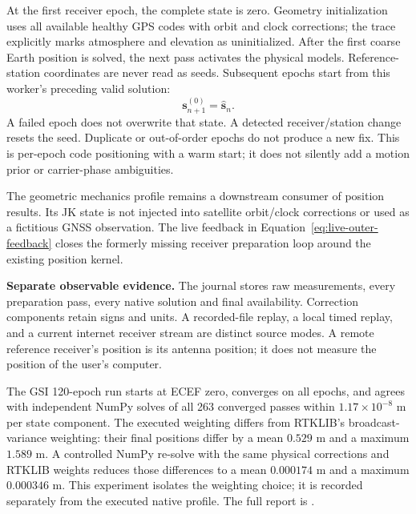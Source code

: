 At the first receiver epoch, the complete state is zero. Geometry initialization
uses all available healthy GPS codes with orbit and clock corrections; the
trace explicitly marks atmosphere and elevation as uninitialized. After the
first coarse Earth position is solved, the next pass activates the physical
models. Reference-station coordinates are never read as seeds. Subsequent
epochs start from this worker's preceding valid solution:
\begin{equation}
 \boldsymbol s_{n+1}^{(0)}=\widehat{\boldsymbol s}_n.
\end{equation}
A failed epoch does not overwrite that state. A detected receiver/station change
resets the seed. Duplicate or out-of-order epochs do not produce a new fix.
This is per-epoch code positioning with a warm start; it does not silently add
a motion prior or carrier-phase ambiguities.

The geometric mechanics profile remains a downstream consumer of position
results. Its JK state is not injected into satellite orbit/clock corrections
or used as a fictitious GNSS observation. The live feedback in
Equation~\eqref{eq:live-outer-feedback} closes the formerly missing receiver
preparation loop around the existing position kernel.

\begin{panel}
\textbf{Separate observable evidence.}
The journal stores raw measurements, every preparation pass, every native
solution and final availability. Correction components retain signs and units.
A recorded-file replay, a local timed replay, and a current internet receiver
stream are distinct source modes. A remote reference receiver's position is
its antenna position; it does not measure the position of the user's computer.
\end{panel}

The GSI 120-epoch run starts at ECEF zero, converges on all epochs, and agrees
with independent NumPy solves of all 263 converged passes within
$1.17\times10^{-8}$ m per state component. The executed weighting differs from
RTKLIB's broadcast-variance weighting: their final positions differ by a mean
$0.529$ m and a maximum $1.589$ m. A controlled NumPy re-solve with the same
physical corrections and RTKLIB weights reduces those differences to a mean
$0.000174$ m and a maximum $0.000346$ m. This experiment isolates the weighting
choice; it is recorded separately from the executed native profile. The full
report is .
